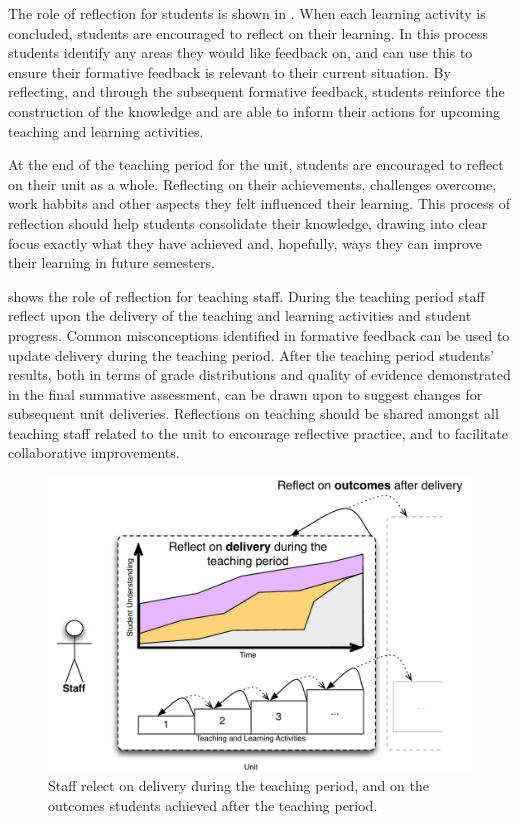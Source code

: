 The role of reflection for students is shown in . When each learning activity is concluded, students are encouraged to reflect on their learning. In this process students identify any areas they would like feedback on, and can use this to ensure their formative feedback is relevant to their current situation. By reflecting, and through the subsequent formative feedback, students reinforce the construction of the knowledge and are able to inform their actions for upcoming teaching and learning activities.

At the end of the teaching period for the unit, students are encouraged to reflect on their unit as a whole. Reflecting on their achievements, challenges overcome, work habbits and other aspects they felt influenced their learning. This process of reflection should help students consolidate their knowledge, drawing into clear focus exactly what they have achieved and, hopefully, ways they can improve their learning in future semesters.

 shows the role of reflection for teaching staff. During the teaching period staff reflect upon the delivery of the teaching and learning activities and student progress. Common misconceptions identified in formative feedback can be used to update delivery during the teaching period. After the teaching period students' results, both in terms of grade distributions and quality of evidence demonstrated in the final summative assessment, can be drawn upon to suggest changes for subsequent unit deliveries. Reflections on teaching should be shared amongst all teaching staff related to the unit to encourage reflective practice, and to facilitate collaborative improvements.

\begin{figure}[ptbh]
	\centering
	\includegraphics[width=\textwidth]{StaffReflection}
	\caption{Staff relect on delivery during the teaching period, and on the outcomes students achieved after the teaching period.}
	\label{fig:staff_reflection}
\end{figure} 

